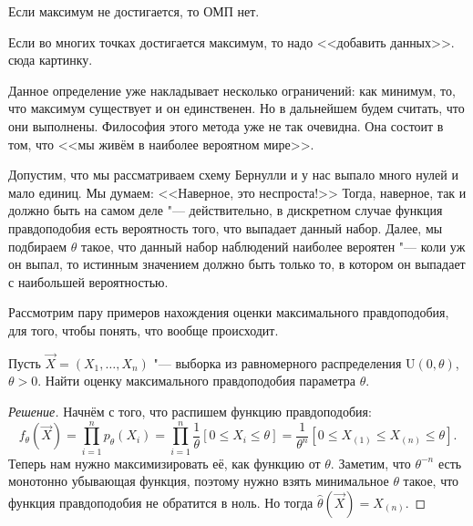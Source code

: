 \begin{remark}
    Если максимум не достигается, то ОМП нет.
\end{remark}

\begin{remark}
    Если во многих точках достигается максимум, то надо <<добавить данных>>. сюда картинку.
\end{remark}
Данное определение уже накладывает несколько ограничений: как минимум, то, что максимум существует и он единственен. Но в дальнейшем будем считать, что они выполнены. Философия этого метода уже не так очевидна. Она состоит в том, что <<мы живём в наиболее вероятном мире>>.

Допустим, что мы рассматриваем схему Бернулли и у нас выпало много нулей и мало единиц. Мы думаем: <<Наверное, это неспроста!>> Тогда, наверное, так и должно быть на самом деле "--- действительно, в дискретном случае функция правдоподобия есть вероятность того, что выпадает данный набор. Далее, мы подбираем $\theta$ такое, что данный набор наблюдений наиболее вероятен "--- коли уж он выпал, то истинным значением должно быть только то, в котором он выпадает с наибольшей вероятностью.

Рассмотрим пару примеров нахождения оценки максимального правдоподобия, для того, чтобы понять, что вообще происходит.
\begin{problem}
    Пусть $\vec{X} = (X_{1}, \ldots, X_{n})$ "--- выборка из равномерного распределения $\mathrm{U}(0, \theta)$, $\theta > 0$. Найти оценку максимального правдоподобия параметра $\theta$.
\end{problem}
\begin{proof}[Решение]
    Начнём с того, что распишем функцию правдоподобия:
    \[
        f_{\theta}(\vec{X}) = \prod_{i = 1}^{n} p_{\theta}(X_{i}) = \prod_{i = 1}^{n} \frac{1}{\theta}[0 \leq X_{i} \leq \theta] = \frac{1}{\theta^{n}}[0 \leq X_{(1)} \leq X_{(n)} \leq \theta].
    \]
    Теперь нам нужно максимизировать её, как функцию от $\theta$. Заметим, что $\theta^{-n}$ есть монотонно убывающая функция, поэтому нужно взять минимальное $\theta$ такое, что функция правдоподобия не обратится в ноль. Но тогда $\hat{\theta}(\vec{X}) = X_{(n)}$.
\end{proof}

